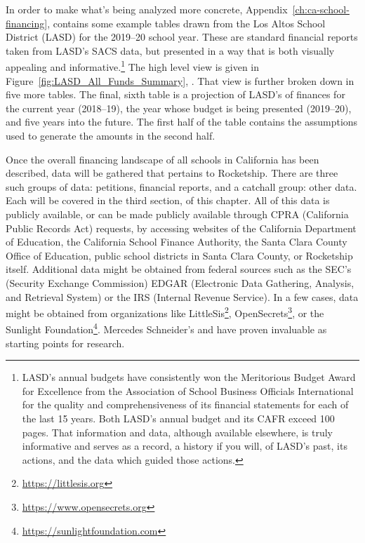 In order to make what's being analyzed more concrete, Appendix~\ref{ch:ca-school-financing}, \textit{} contains some example tables drawn from the Los Altos School District (LASD) for the 2019–20 school year. These are standard financial reports taken from LASD's SACS data, but presented in a way that is both visually appealing and informative.\footnote{LASD's annual budgets have consistently won the Meritorious Budget Award for Excellence from the Association of School Business Officials International for the quality and comprehensiveness of its financial statements for each of the last 15 years. Both LASD's annual budget and its CAFR exceed 100 pages. That information and data, although available elsewhere, is truly informative and serves as a record, a history if you will, of LASD's past, its actions, and the data which guided those actions.} The high level view is given in Figure~\ref{fig:LASD_All_Funds_Summary}, \textit{}. That view is further broken down in five more tables. The final, sixth table is a projection of LASD's of finances for the current year (2018–19), the year whose budget is being presented (2019–20), and five years into the future. The first half of the table contains the assumptions used to generate the amounts in the second half.

Once the overall financing landscape of all schools in California has been described, data will be gathered that pertains to  Rocketship. There are three such groups of data: petitions, financial reports, and a catchall group: other data. Each will be covered in the third section, \textit{} of this chapter. All of this data is publicly available, or can be made publicly available through CPRA (California Public Records Act) requests, by accessing websites of the California Department of Education, the California School Finance Authority, the Santa Clara County Office of Education, public school districts in Santa Clara County, or Rocketship itself. Additional data might be obtained from federal sources such as the SEC's (Security Exchange Commission) EDGAR (Electronic Data Gathering, Analysis, and Retrieval System) or the IRS (Internal Revenue Service). In a few cases, data might be obtained from organizations like LittleSis\footnote{\url{https://littlesis.org}}, OpenSecrets\footnote{\url{https://www.opensecrets.org}}, or the Sunlight Foundation\footnote{\url{https://sunlightfoundation.com}}. Mercedes Schneider's  \parencite{Schneider2020} and  \parencite{Schneider2014} have proven invaluable as starting points for research.

